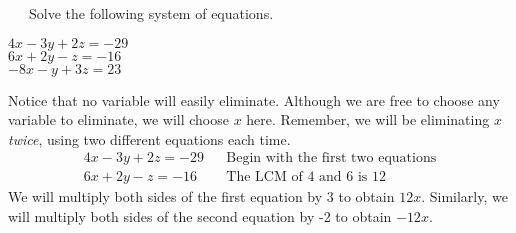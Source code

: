 \begin{example}~~~Solve the following system of equations.
\begin{center}
		$4 x - 3 y + 2 z = - 29~$\\
		$6 x + 2 y - z = - 16$\\
		$- 8 x - y + 3 z = 23~~~~$
\end{center}
Notice that no variable will easily eliminate.  Although we are free to choose any variable to eliminate, we will choose $x$ here.  Remember, we will be eliminating $x$ \textit{twice}, using two different equations each time.
	\begin{eqnarray*}
    4 x - 3 y + 2 z = - 29 &  & \text{Begin~with~the~first~two~equations}\\
		6 x + 2 y - z = - 16& & \text{The~LCM~of~} 4 \text{~and~} 6 \text{~is~} 12%
	\end{eqnarray*}
We will multiply both sides of the first equation by 3 to obtain $12x$.  Similarly, we will multiply both sides of the second equation by -2 to obtain $-12x$.


\end{example}
